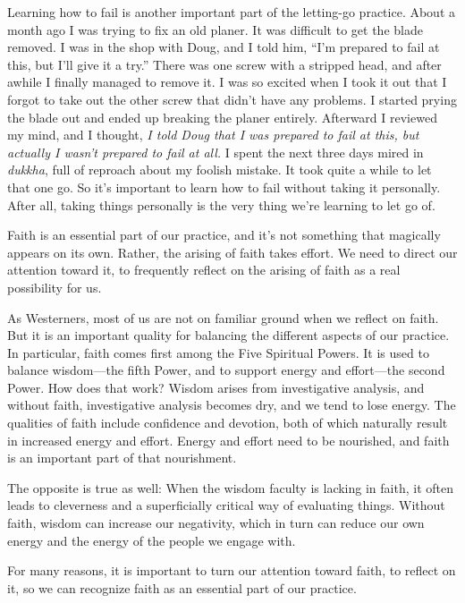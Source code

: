 Learning how to fail is another important part of the letting-go 
practice. About a month ago I was trying to fix an old planer. It was 
difficult to get the blade removed. I was in the shop with Doug, and I 
told him, ``I'm prepared to fail at this, but I'll give it a try.'' 
There was one screw with a stripped head, and after awhile I finally 
managed to remove it. I was so excited when I took it out that I forgot 
to take out the other screw that didn't have any problems. I started 
prying the blade out and ended up breaking the planer entirely. 
Afterward I reviewed my mind, and I thought, \emph{I told Doug that I 
was prepared to fail at this, but actually I wasn't prepared to fail at 
all.} I spent the next three days mired in \emph{dukkha}, full of 
reproach about my foolish mistake. It took quite a while to let that 
one go. So it's important to learn how to fail without taking it 
personally. After all, taking things personally is the very thing we're 
learning to let go of.


Faith is an essential part of our practice, and it's not something that 
magically appears on its own. Rather, the arising of faith takes 
effort. We need to direct our attention toward it, to frequently 
reflect on the arising of faith as a real possibility for us.

As Westerners, most of us are not on familiar ground when we reflect on 
faith. But it is an important quality for balancing the different 
aspects of our practice. In particular, faith comes first among the 
Five Spiritual Powers. It is used to balance wisdom---the fifth Power, 
and to support energy and effort---the second Power. How does that 
work? Wisdom arises from investigative analysis, and without faith, 
investigative analysis becomes dry, and we tend to lose energy. The 
qualities of faith include confidence and devotion, both of which 
naturally result in increased energy and effort. Energy and effort need 
to be nourished, and faith is an important part of that nourishment.

The opposite is true as well: When the wisdom faculty is lacking in 
faith, it often leads to cleverness and a superficially critical way of 
evaluating things. Without faith, wisdom can increase our negativity, 
which in turn can reduce our own energy and the energy of the people we 
engage with.

For many reasons, it is important to turn our attention toward faith, 
to reflect on it, so we can recognize faith as an essential part of our 
practice.

